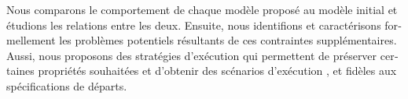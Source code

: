 \begin{abstractfr}
\begin{otherlanguage}{french}
  Nous comparons le comportement de chaque modèle proposé au modèle initial et étudions
les relations entre les deux. Ensuite, nous identifions et caractérisons formellement les 
problèmes potentiels résultants de ces contraintes supplémentaires. Aussi, nous proposons 
des stratégies d'exécution qui permettent de préserver certaines propriétés souhaitées 
et d'obtenir des scénarios d'exécution , et fidèles aux spécifications 
de départs.
\end{otherlanguage}
\end{abstractfr}
